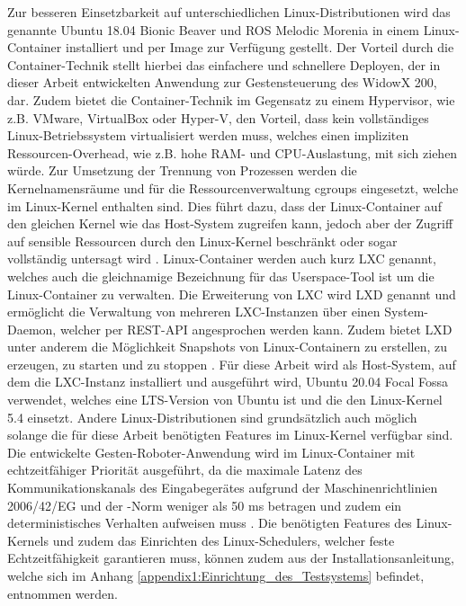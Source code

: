 Zur besseren Einsetzbarkeit auf unterschiedlichen Linux-Distributionen wird das genannte Ubuntu 18.04 Bionic Beaver und ROS Melodic Morenia in einem Linux-Container installiert und per Image zur Verfügung gestellt. Der Vorteil durch die Container-Technik stellt hierbei das einfachere und schnellere Deployen, der in dieser Arbeit entwickelten Anwendung zur Gestensteuerung des WidowX 200, dar. Zudem bietet die Container-Technik im Gegensatz zu einem Hypervisor, wie z.B. VMware, VirtualBox oder Hyper-V, den Vorteil, dass kein vollständiges Linux-Betriebssystem virtualisiert werden muss, welches einen impliziten Ressourcen-Overhead, wie z.B. hohe RAM- und CPU-Auslastung, mit sich ziehen würde. Zur Umsetzung der Trennung von Prozessen werden die Kernelnamensräume und für die Ressourcenverwaltung cgroups eingesetzt, welche im Linux-Kernel enthalten sind. Dies führt dazu, dass der Linux-Container auf den gleichen Kernel wie das Host-System zugreifen kann, jedoch aber der Zugriff auf sensible Ressourcen durch den Linux-Kernel beschränkt oder sogar vollständig untersagt wird \cite{lxc_2020}. Linux-Container werden auch kurz LXC genannt, welches auch die gleichnamige Bezeichnung für das Userspace-Tool ist um die Linux-Container zu verwalten. Die Erweiterung von LXC wird LXD genannt und ermöglicht die Verwaltung von mehreren LXC-Instanzen über einen System-Daemon, welcher per REST-API angesprochen werden kann. Zudem bietet LXD unter anderem die Möglichkeit Snapshots von Linux-Containern zu erstellen, zu erzeugen, zu starten und zu stoppen \cite{lxc_2017}. Für diese Arbeit wird als Host-System, auf dem die LXC-Instanz installiert und ausgeführt wird, Ubuntu 20.04 Focal Fossa verwendet, welches eine LTS-Version von Ubuntu ist und die den Linux-Kernel 5.4 einsetzt. Andere Linux-Distributionen sind grundsätzlich auch möglich solange die für diese Arbeit benötigten Features im Linux-Kernel verfügbar sind. Die entwickelte Gesten-Roboter-Anwendung wird im Linux-Container mit echtzeitfähiger Priorität ausgeführt, da die maximale Latenz des Kommunikationskanals des Eingabegerätes aufgrund der Maschinenrichtlinien 2006/42/EG und der -Norm weniger als 50 ms betragen und zudem ein deterministisches Verhalten aufweisen muss \cite[55]{prassler_advances_2004}. Die benötigten Features des Linux-Kernels und zudem das Einrichten des Linux-Schedulers, welcher feste Echtzeitfähigkeit garantieren muss, können zudem aus der Installationsanleitung, welche sich im Anhang \ref{appendix1:Einrichtung_des_Testsystems} befindet, entnommen werden.

